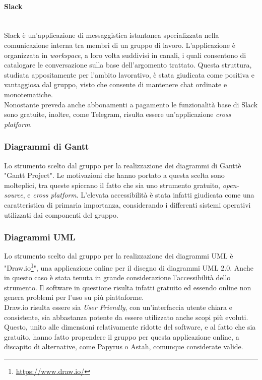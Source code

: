 \paragraph{Slack} ~\\
	Slack è un'applicazione di messaggistica istantanea specializzata nella comunicazione interna tra membri di un 			gruppo di lavoro. L'applicazione è organizzata in \textit{workspace}, a loro volta suddivisi in canali, i quali 			consentono di catalogare le conversazione sulla base dell'argomento trattato. Questa struttura, studiata 						appositamente per l'ambito lavorativo, è stata giudicata come positiva e vantaggiosa dal gruppo, visto che 					consente di mantenere chat ordinate e monotematiche.\\
	Nonostante preveda anche abbonamenti a pagamento le funzionalità base di Slack sono gratuite, inoltre, come 					Telegram, risulta essere un'applicazione \textit{cross platform}\glossario.

\subsubsection{Diagrammi di Gantt}
	Lo strumento scelto dal gruppo per la realizzazione dei diagrammi di Gantt\glossario è "Gantt Project". Le 					motivazioni che hanno portato a questa scelta sono molteplici, tra queste spiccano il fatto che sia uno strumento 	gratuito, \textit{open-source}\glossario, e \textit{cross platform}. L'elevata accessibilità è stata infatti 				giudicata come una caratteristica di primaria importanza, considerando i differenti sistemi operativi utilizzati 		dai componenti del gruppo.

\subsubsection{Diagrammi UML}
	Lo strumento scelto dal gruppo per la realizzazione dei diagrammi UML è "Draw.io\footnote{\url{https://www.draw.io/}}", una applicazione online per il disegno di diagrammi UML 2.0. Anche in questo caso è stata tenuta in grande considerazione l'accessibilità dello strumento. Il software in questione risulta infatti gratuito ed essendo online non genera problemi per l'uso su più piattaforme.\\
	Draw.io risulta essere sia \textit{User Friendly}, con un'interfaccia utente chiara e consistente, sia abbastanza potente da essere utilizzato anche scopi più evoluti. Questo, unito alle dimensioni relativamente ridotte del software, e al fatto che sia gratuito, hanno fatto propendere il gruppo per questa applicazione online, a discapito di alternative, come Papyrus o Astah, comunque considerate valide.
